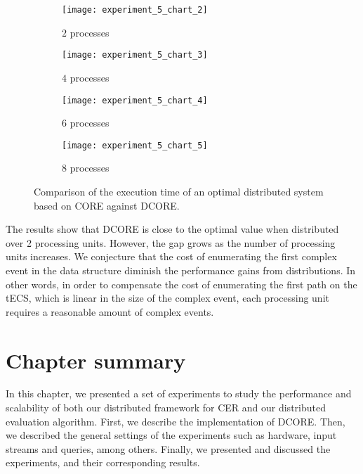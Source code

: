 \begin{figure}[H]
     \begin{subfigure}[b]{0.49\textwidth}
         \centering
         \texttt{[image: experiment\_5\_chart\_2]}
         \caption{$2$ processes}
         \label{fig:experiment:6:subfigure:1}
     \end{subfigure}
     \begin{subfigure}[b]{0.49\textwidth}
         \centering
         \texttt{[image: experiment\_5\_chart\_3]}
         \caption{$4$ processes}
         \label{fig:experiment:6:subfigure:2}
     \end{subfigure}
     \begin{subfigure}[b]{0.49\textwidth}
         \centering
         \texttt{[image: experiment\_5\_chart\_4]}
         \caption{$6$ processes}
         \label{fig:experiment:6:subfigure:3}
     \end{subfigure}
     \begin{subfigure}[b]{0.49\textwidth}
         \centering
         \texttt{[image: experiment\_5\_chart\_5]}
         \caption{$8$ processes}
         \label{fig:experiment:6:subfigure:4}
     \end{subfigure}
     \caption{Comparison of the execution time of an optimal distributed system based on CORE against DCORE.}
     \label{fig:experiment:6}
\end{figure}

The results show that DCORE is close to the optimal value when distributed over 2 processing units. However, the gap grows as the number of processing units increases. We conjecture that the cost of enumerating the first complex event in the data structure diminish the performance gains from distributions. In other words, in order to compensate the cost of enumerating the first path on the tECS, which is linear in the size of the complex event, each processing unit requires a reasonable amount of complex events.


\section{Chapter summary}

In this chapter, we presented a set of experiments to study the performance and scalability of both our distributed framework for CER and our distributed evaluation algorithm. First, we describe the implementation of DCORE. Then, we described the general settings of the experiments such as hardware, input streams and queries, among others. Finally, we presented and discussed the experiments, and their corresponding results.
